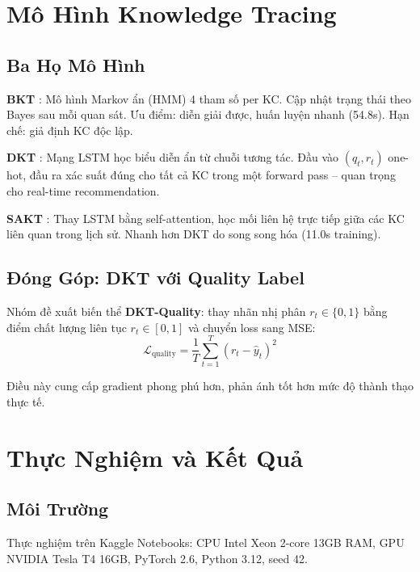 \documentclass[conference]{IEEEtran}
\begin{document}
\section{Mô Hình Knowledge Tracing}
\label{sec:kt}

\subsection{Ba Họ Mô Hình}

\textbf{BKT} \cite{corbett1994knowledge}: Mô hình Markov ẩn (HMM) 4 tham số per KC. Cập nhật trạng thái theo Bayes sau mỗi quan sát. Ưu điểm: diễn giải được, huấn luyện nhanh (54.8s). Hạn chế: giả định KC độc lập.

\textbf{DKT} \cite{piech2015deep}: Mạng LSTM học biểu diễn ẩn từ chuỗi tương tác. Đầu vào $(q_t, r_t)$ one-hot, đầu ra xác suất đúng cho tất cả KC trong một forward pass -- quan trọng cho real-time recommendation.

\textbf{SAKT} \cite{pandey2019self}: Thay LSTM bằng self-attention, học mối liên hệ trực tiếp giữa các KC liên quan trong lịch sử. Nhanh hơn DKT do song song hóa (11.0s training).

\subsection{Đóng Góp: DKT với Quality Label}

Nhóm đề xuất biến thể \textbf{DKT-Quality}: thay nhãn nhị phân $r_t \in \{0,1\}$ bằng điểm chất lượng liên tục $r_t \in [0,1]$ và chuyển loss sang MSE:
\begin{equation}
  \mathcal{L}_{\text{quality}} = \frac{1}{T}\sum_{t=1}^{T}(r_t - \hat{y}_t)^2
\end{equation}

Điều này cung cấp gradient phong phú hơn, phản ánh tốt hơn mức độ thành thạo thực tế.

\section{Thực Nghiệm và Kết Quả}
\label{sec:exp}

\subsection{Môi Trường}

Thực nghiệm trên Kaggle Notebooks: CPU Intel Xeon 2-core 13GB RAM, GPU NVIDIA Tesla T4 16GB, PyTorch 2.6, Python 3.12, seed 42.
\end{document}
